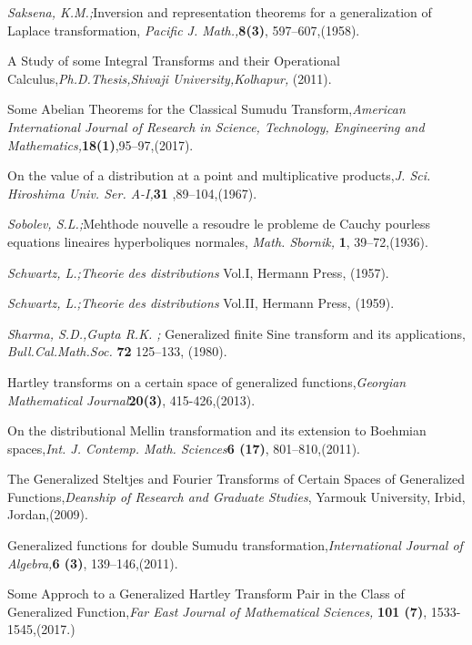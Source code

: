 \begin{thebibliography}{00}
 {\sl Saksena, K.M.;}Inversion and representation theorems for a generalization of
Laplace transformation, {\it Pacific J. Math.,}{\bf 8(3)}, 597--607,(1958).

A Study of some Integral Transforms and their Operational Calculus,{\it Ph.D.Thesis,Shivaji University,Kolhapur,} (2011).

Some Abelian Theorems for the Classical Sumudu Transform,{\it American International Journal of
Research in Science, Technology,
Engineering and Mathematics,}{\bf 18(1)},95--97,(2017).


 On the value of a distribution at a point and multiplicative products,{\it J. Sci. Hiroshima Univ. Ser. A-I,}{\bf 31 },89--104,(1967).

 {\sl Sobolev, S.L.;}Mehthode nouvelle a resoudre le probleme de Cauchy pourless equations lineaires hyperboliques normales, {\it Math. Sbornik,} {\bf 1}, 39--72,(1936).

 {\sl Schwartz, L.;}{\it Theorie des distributions} Vol.I, Hermann Press, (1957).

 {\sl Schwartz, L.;}{\it Theorie des distributions} Vol.II, Hermann Press, (1959).

 {\sl Sharma, S.D.,Gupta R.K. ;} Generalized finite Sine transform and
its applications, {\it Bull.Cal.Math.Soc.} {\bf 72} 125--133, (1980).

Hartley transforms on a certain space of generalized functions,{\it Georgian Mathematical Journal}{\bf 20(3)}, 415-426,(2013).

On the distributional Mellin transformation and its extension to Boehmian spaces,{\it Int. J. Contemp. Math. Sciences}{\bf 6 (17)}, 801--810,(2011).

The Generalized Steltjes and Fourier Transforms of Certain Spaces of Generalized Functions,{\it Deanship of Research and Graduate Studies}, Yarmouk University, Irbid, Jordan,(2009).

Generalized functions for double Sumudu transformation,{\it International Journal of Algebra,}{\bf 6 (3)}, 139--146,(2011).

Some Approch  to a  Generalized Hartley  Transform  Pair  in the Class of Generalized Function,{\it Far East Journal of Mathematical Sciences,} {\bf 101 (7)}, 1533-1545,(2017.)


\end{thebibliography}
